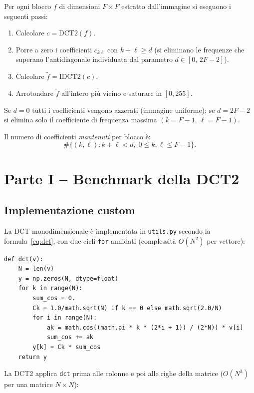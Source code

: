 \documentclass[12pt,a4paper]{article}
\begin{document}
Per ogni blocco $f$ di dimensioni $F\times F$ estratto dall'immagine si eseguono
i seguenti passi:
\begin{enumerate}
  \item Calcolare $c = \text{DCT2}(f)$.
  \item Porre a zero i coefficienti $c_{k\ell}$ con $k + \ell \geq d$
        (si eliminano le frequenze che superano l'antidiagonale
        individuata dal parametro $d \in [0,\, 2F-2]$).
  \item Calcolare $\tilde{f} = \text{IDCT2}(c)$.
  \item Arrotondare $\tilde{f}$ all'intero più vicino e saturare in $[0, 255]$.
\end{enumerate}
Se $d = 0$ tutti i coefficienti vengono azzerati (immagine uniforme); se
$d = 2F-2$ si elimina solo il coefficiente di frequenza massima
$(k = F-1,\, \ell = F-1)$.

Il numero di coefficienti \emph{mantenuti} per blocco è:
\begin{equation}
  \#\{(k,\ell) : k + \ell < d,\; 0 \le k,\ell \le F-1\}.
\end{equation}

\section{Parte I -- Benchmark della DCT2}

\subsection{Implementazione custom}

La DCT monodimensionale è implementata in \texttt{utils.py} secondo la
formula~\eqref{eq:dct}, con due cicli \texttt{for} annidati (complessità
$O(N^2)$ per vettore):

\begin{lstlisting}[caption={DCT monodimensionale -- \texttt{utils.py}}]
def dct(v):
    N = len(v)
    y = np.zeros(N, dtype=float)
    for k in range(N):
        sum_cos = 0.
        Ck = 1.0/math.sqrt(N) if k == 0 else math.sqrt(2.0/N)
        for i in range(N):
            ak = math.cos((math.pi * k * (2*i + 1)) / (2*N)) * v[i]
            sum_cos += ak
        y[k] = Ck * sum_cos
    return y
\end{lstlisting}

La DCT2 applica \texttt{dct} prima alle colonne e poi alle righe della matrice
($O(N^3)$ per una matrice $N\times N$):
\end{document}
